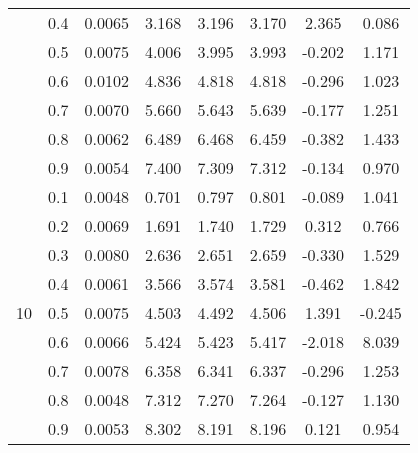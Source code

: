 \documentclass[11pt,a4paper]{report}
\begin{document}
\begin{longtable}{ | c | c || c | c | c | c | c | c | }
 & 0.4 & 0.0065 & 3.168 & 3.196 & 3.170 & 2.365 & 0.086 \\
 & 0.5 & 0.0075 & 4.006 & 3.995 & 3.993 & -0.202 & 1.171 \\
 & 0.6 & 0.0102 & 4.836 & 4.818 & 4.818 & -0.296 & 1.023 \\
 & 0.7 & 0.0070 & 5.660 & 5.643 & 5.639 & -0.177 & 1.251 \\
 & 0.8 & 0.0062 & 6.489 & 6.468 & 6.459 & -0.382 & 1.433 \\
 & 0.9 & 0.0054 & 7.400 & 7.309 & 7.312 & -0.134 & 0.970 \\
 \hline
\multirow{9}{*}{10} & 0.1 & 0.0048 & 0.701 & 0.797 & 0.801 & -0.089 & 1.041 \\
 & 0.2 & 0.0069 & 1.691 & 1.740 & 1.729 & 0.312 & 0.766 \\
 & 0.3 & 0.0080 & 2.636 & 2.651 & 2.659 & -0.330 & 1.529 \\
 & 0.4 & 0.0061 & 3.566 & 3.574 & 3.581 & -0.462 & 1.842 \\
 & 0.5 & 0.0075 & 4.503 & 4.492 & 4.506 & 1.391 & -0.245 \\
 & 0.6 & 0.0066 & 5.424 & 5.423 & 5.417 & -2.018 & 8.039 \\
 & 0.7 & 0.0078 & 6.358 & 6.341 & 6.337 & -0.296 & 1.253 \\
 & 0.8 & 0.0048 & 7.312 & 7.270 & 7.264 & -0.127 & 1.130 \\
 & 0.9 & 0.0053 & 8.302 & 8.191 & 8.196 & 0.121 & 0.954 \\
 \hline
\hline
\end{longtable}
\end{document}
